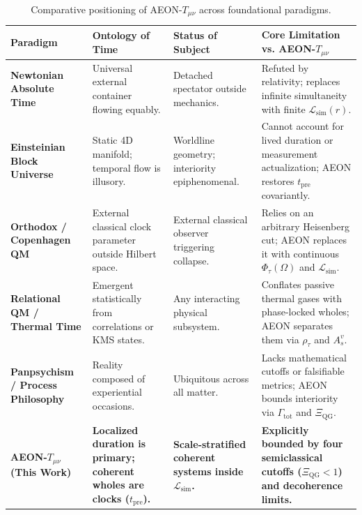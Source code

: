 \documentclass[11pt,a4paper]{article}
\begin{document}
\begin{table}[h!]
\centering
\footnotesize
\begin{tabularx}{\textwidth}{@{}p{2.6cm} p{2.7cm} p{2.7cm} X@{}}
\toprule
\textbf{Paradigm} & \textbf{Ontology of Time} & \textbf{Status of Subject} & \textbf{Core Limitation vs. AEON-$T_{\mu\nu}$} \\
\midrule
\textbf{Newtonian Absolute Time} & Universal external container flowing equably. & Detached spectator outside mechanics. & Refuted by relativity; replaces infinite simultaneity with finite $\mathcal{L}_{\text{sim}}(r)$. \\
\addlinespace[0.3em]
\textbf{Einsteinian Block Universe} & Static 4D manifold; temporal flow is illusory. & Worldline geometry; interiority epiphenomenal. & Cannot account for lived duration or measurement actualization; AEON restores $t_{\text{pre}}$ covariantly. \\
\addlinespace[0.3em]
\textbf{Orthodox / Copenhagen QM} & External classical clock parameter outside Hilbert space. & External classical observer triggering collapse. & Relies on an arbitrary Heisenberg cut; AEON replaces it with continuous $\Phi_\tau(\Omega)$ and $\mathcal{L}_{\text{sim}}$. \\
\addlinespace[0.3em]
\textbf{Relational QM / Thermal Time} & Emergent statistically from correlations or KMS states. & Any interacting physical subsystem. & Conflates passive thermal gases with phase-locked wholes; AEON separates them via $\rho_\tau$ and $A_s^v$. \\
\addlinespace[0.3em]
\textbf{Panpsychism / Process Philosophy} & Reality composed of experiential occasions. & Ubiquitous across all matter. & Lacks mathematical cutoffs or falsifiable metrics; AEON bounds interiority via $\Gamma_{\text{tot}}$ and $\Xi_{\text{QG}}$. \\
\addlinespace[0.3em]
\textbf{AEON-$T_{\mu\nu}$ (This Work)} & \textbf{Localized duration is primary; coherent wholes are clocks ($t_{\text{pre}}$).} & \textbf{Scale-stratified coherent systems inside $\mathcal{L}_{\text{sim}}$.} & \textbf{Explicitly bounded by four semiclassical cutoffs ($\Xi_{\text{QG}} < 1$) and decoherence limits.} \\
\bottomrule
\end{tabularx}
\caption{Comparative positioning of AEON-$T_{\mu\nu}$ across foundational paradigms.}
\end{table}
\end{document}
